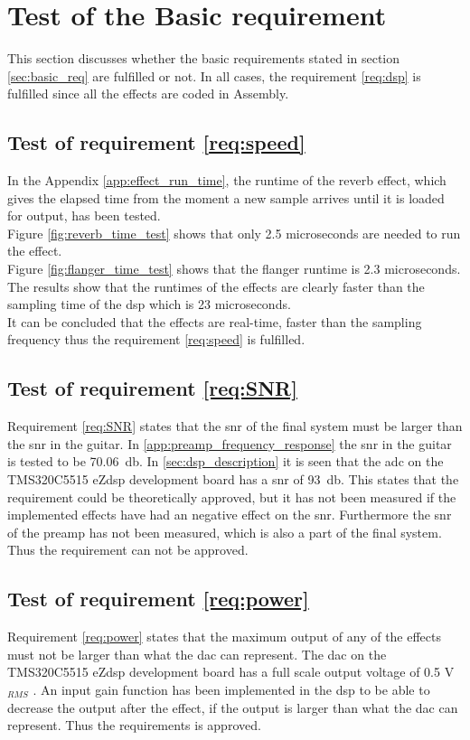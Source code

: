 \section{Test of the Basic requirement}
This section discusses whether the basic requirements stated in section \ref{sec:basic_req} are fulfilled or not. 
In all cases, the requirement \ref{req:dsp} is fulfilled since all the effects are coded in Assembly.


\subsection{Test of requirement \autoref{req:speed}}

In the Appendix \ref{app:effect_run_time}, the runtime of the reverb effect, which gives the elapsed time from the moment a new sample arrives until it is loaded for output, has been tested. \\
Figure \ref{fig:reverb_time_test} shows that only 2.5 microseconds are needed to run the effect. \\
Figure \ref{fig:flanger_time_test} shows that the flanger runtime is 2.3 microseconds. \\
The results show that the runtimes of the effects are clearly faster than the sampling time of the \gls{dsp} which is 23 microseconds. \\
It can be concluded that the effects are real-time, faster than the sampling frequency thus the requirement \ref{req:speed} is fulfilled. \\

\subsection{Test of requirement \autoref{req:SNR}}
Requirement \autoref{req:SNR} states that the \gls{snr} of the final system must be larger than the \gls{snr} in the guitar. In \autoref{app:preamp_frequency_response} the \gls{snr} in the guitar is tested to be \SI{70.06}{\decibel}. In \autoref{sec:dsp_description} it is seen that the \gls{adc} on the TMS320C5515 eZdsp development board has a \gls{snr} of \SI{93}{\decibel}. This states that the requirement could be theoretically approved, but it has not been measured if the implemented effects have had an negative effect on the \gls{snr}. Furthermore the \gls{snr} of the \gls{preamp} has not been measured, which is also a part of the final system. Thus the requirement can not be approved. 

\subsection{Test of requirement \autoref{req:power}}
Requirement \autoref{req:power} states that the maximum output of any of the effects must not be larger than what the \gls{dac} can represent. The \gls{dac} on the TMS320C5515 eZdsp development board has a full scale output voltage of 0.5 V$_{RMS}$ \citep{TLV320AIC3204}. An input gain function has been implemented in the \gls{dsp} to be able to decrease the output after the effect, if the output is larger than what the \gls{dac} can represent. Thus the requirements is approved.

